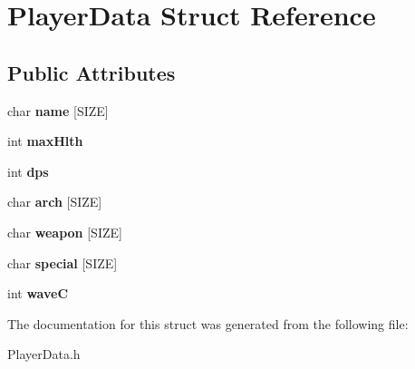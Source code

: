 \hypertarget{struct_player_data}{}\section{Player\+Data Struct Reference}
\label{struct_player_data}
\subsection*{Public Attributes}
\begin{DoxyCompactItemize}
\item 
\hypertarget{struct_player_data_a0a7bcd24293025f999d1bcfb353d065f}{}char {\bfseries name} \mbox{[}S\+I\+Z\+E\mbox{]}\label{struct_player_data_a0a7bcd24293025f999d1bcfb353d065f}

\item 
\hypertarget{struct_player_data_a9cef1734f7d49c3d84e2abb72487d429}{}int {\bfseries max\+Hlth}\label{struct_player_data_a9cef1734f7d49c3d84e2abb72487d429}

\item 
\hypertarget{struct_player_data_af2179c996c7bff935b2ee29859c6c555}{}int {\bfseries dps}\label{struct_player_data_af2179c996c7bff935b2ee29859c6c555}

\item 
\hypertarget{struct_player_data_a73a4e77952cd0cf40157ef0e6ae08fee}{}char {\bfseries arch} \mbox{[}S\+I\+Z\+E\mbox{]}\label{struct_player_data_a73a4e77952cd0cf40157ef0e6ae08fee}

\item 
\hypertarget{struct_player_data_afc7f5974502f4888d24e8a092f644a22}{}char {\bfseries weapon} \mbox{[}S\+I\+Z\+E\mbox{]}\label{struct_player_data_afc7f5974502f4888d24e8a092f644a22}

\item 
\hypertarget{struct_player_data_a8a5e23e4740662e1630c854c440d9978}{}char {\bfseries special} \mbox{[}S\+I\+Z\+E\mbox{]}\label{struct_player_data_a8a5e23e4740662e1630c854c440d9978}

\item 
\hypertarget{struct_player_data_a727d01be078ae9173d39c09c01fb11ee}{}int {\bfseries wave\+C}\label{struct_player_data_a727d01be078ae9173d39c09c01fb11ee}

\end{DoxyCompactItemize}


The documentation for this struct was generated from the following file\+:\begin{DoxyCompactItemize}
\item 
Player\+Data.\+h\end{DoxyCompactItemize}
